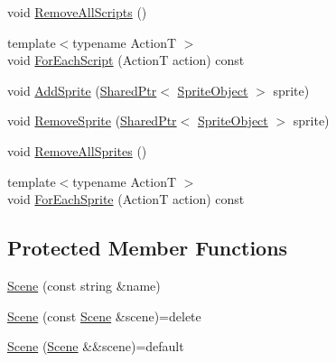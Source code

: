\begin{DoxyCompactItemize}
\item 
void \hyperlink{classmage_1_1_scene_a04b6e0b4d9ca18d15d3da098e581d336}{Remove\+All\+Scripts} ()
\item 
{\footnotesize template$<$typename ActionT $>$ }\\void \hyperlink{classmage_1_1_scene_a4d16d973adce12868b9a0df9d92ef6d6}{For\+Each\+Script} (ActionT action) const
\item 
void \hyperlink{classmage_1_1_scene_a735a4eba6bf6a072195f1cfc58dfca47}{Add\+Sprite} (\hyperlink{namespacemage_a1e01ae66713838a7a67d30e44c67703e}{Shared\+Ptr}$<$ \hyperlink{classmage_1_1_sprite_object}{Sprite\+Object} $>$ sprite)
\item 
void \hyperlink{classmage_1_1_scene_a6d886d48157b9988ab61cc9b01ee752e}{Remove\+Sprite} (\hyperlink{namespacemage_a1e01ae66713838a7a67d30e44c67703e}{Shared\+Ptr}$<$ \hyperlink{classmage_1_1_sprite_object}{Sprite\+Object} $>$ sprite)
\item 
void \hyperlink{classmage_1_1_scene_aad8b532e9c127fd216ca9db9ad9f3420}{Remove\+All\+Sprites} ()
\item 
{\footnotesize template$<$typename ActionT $>$ }\\void \hyperlink{classmage_1_1_scene_ae181b160f9a75593db9f551c9c233329}{For\+Each\+Sprite} (ActionT action) const
\end{DoxyCompactItemize}
\subsection*{Protected Member Functions}
\begin{DoxyCompactItemize}
\item 
\hyperlink{classmage_1_1_scene_aab61b38547fc53aa9c5b3b559f4d2e26}{Scene} (const string \&name)
\item 
\hyperlink{classmage_1_1_scene_a88d83ccb2e10549d5370f850b2b4c228}{Scene} (const \hyperlink{classmage_1_1_scene}{Scene} \&scene)=delete
\item 
\hyperlink{classmage_1_1_scene_a35b8fc4242c2348e53014b96416fc3d3}{Scene} (\hyperlink{classmage_1_1_scene}{Scene} \&\&scene)=default
\end{DoxyCompactItemize}
